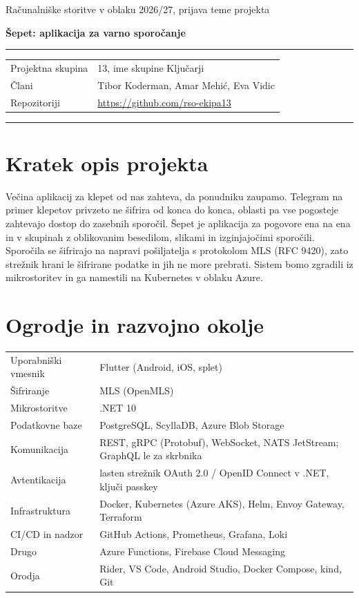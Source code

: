 \documentclass[11pt,a4paper]{article}
\begin{document}
\thispagestyle{first}

{\color{muted}\small Računalniške storitve v oblaku 2026/27, prijava teme projekta}\par\vspace{6pt}
{\sffamily\bfseries\fontsize{22}{26}\selectfont\color{ink} Šepet: aplikacija za varno sporočanje}\par\vspace{10pt}
{\color{rule}\rule{\textwidth}{0.6pt}}\par\vspace{2pt}
\begin{tabularx}{\textwidth}{@{}>{\color{muted}}l Y@{}}
Projektna skupina & 13, ime skupine Ključarji \\
Člani & Tibor Koderman, Amar Mehić, Eva Vidic \\
Repozitoriji & \url{https://github.com/rso-ekipa13} \\
\end{tabularx}\par
{\color{rule}\rule{\textwidth}{0.6pt}}

\section{Kratek opis projekta}
Večina aplikacij za klepet od nas zahteva, da ponudniku zaupamo. Telegram na primer klepetov privzeto ne šifrira od konca do konca, oblasti pa vse pogosteje zahtevajo dostop do zasebnih sporočil. Šepet je aplikacija za pogovore ena na ena in v skupinah z oblikovanim besedilom, slikami in izginjajočimi sporočili. Sporočila se šifrirajo na napravi pošiljatelja s protokolom MLS (RFC 9420), zato strežnik hrani le šifrirane podatke in jih ne more prebrati. Sistem bomo zgradili iz mikrostoritev in ga namestili na Kubernetes v oblaku Azure.

\section{Ogrodje in razvojno okolje}
\begin{tabularx}{\textwidth}{@{}l Y@{}}
\toprule
Uporabniški vmesnik & Flutter (Android, iOS, splet) \\
Šifriranje & MLS (OpenMLS) \\
Mikrostoritve & .NET 10 \\
Podatkovne baze & PostgreSQL, ScyllaDB, Azure Blob Storage \\
Komunikacija & REST, gRPC (Protobuf), WebSocket, NATS JetStream; GraphQL le za skrbnika \\
Avtentikacija & lasten strežnik OAuth 2.0 / OpenID Connect v .NET, ključi passkey \\
Infrastruktura & Docker, Kubernetes (Azure AKS), Helm, Envoy Gateway, Terraform \\
CI/CD in nadzor & GitHub Actions, Prometheus, Grafana, Loki \\
Drugo & Azure Functions, Firebase Cloud Messaging \\
Orodja & Rider, VS Code, Android Studio, Docker Compose, kind, Git \\
\bottomrule
\end{tabularx}
\end{document}
